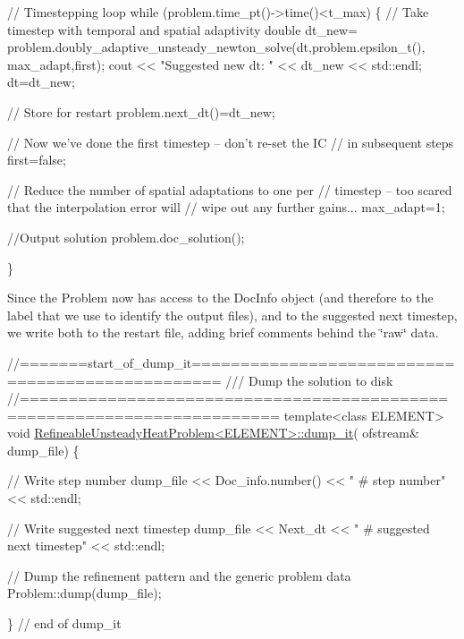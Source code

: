  
\begin{DoxyCodeInclude}
 \textcolor{comment}{// Timestepping loop}
 \textcolor{keywordflow}{while} (problem.time\_pt()->time()<t\_max)
  \{
   \textcolor{comment}{// Take timestep with temporal and spatial adaptivity}
   \textcolor{keywordtype}{double} dt\_new=
   problem.doubly\_adaptive\_unsteady\_newton\_solve(dt,problem.epsilon\_t(),
                                                 max\_adapt,first);
   cout << \textcolor{stringliteral}{"Suggested new dt: "} << dt\_new << std::endl;
   dt=dt\_new;
   
   \textcolor{comment}{// Store for restart}
   problem.next\_dt()=dt\_new;

   \textcolor{comment}{// Now we've done the first timestep -- don't re-set the IC}
   \textcolor{comment}{// in subsequent steps}
   first=\textcolor{keyword}{false};
   
   \textcolor{comment}{// Reduce the number of spatial adaptations to one per }
   \textcolor{comment}{// timestep -- too scared that the interpolation error will }
   \textcolor{comment}{// wipe out any further gains...}
   max\_adapt=1;
   
   \textcolor{comment}{//Output solution}
   problem.doc\_solution();

  \}

\end{DoxyCodeInclude}


Since the {\ttfamily Problem} now has access to the {\ttfamily Doc\+Info} object (and therefore to the label that we use to identify the output files), and to the suggested next timestep, we write both to the restart file, adding brief comments behind the \char`\"{}raw\char`\"{} data.

 
\begin{DoxyCodeInclude}
\textcolor{comment}{//=======start\_of\_dump\_it=================================================}
\textcolor{comment}{/// Dump the solution to disk}
\textcolor{comment}{}\textcolor{comment}{//========================================================================}
\textcolor{keyword}{template}<\textcolor{keyword}{class} ELEMENT>
\textcolor{keywordtype}{void} \hyperlink{classRefineableUnsteadyHeatProblem_a1fb939c3f9c258fd49328bb1516ced98}{RefineableUnsteadyHeatProblem<ELEMENT>::dump\_it}(
      ofstream& dump\_file)
\{

 \textcolor{comment}{// Write step number}
 dump\_file << Doc\_info.number() << \textcolor{stringliteral}{" # step number"} << std::endl;

 \textcolor{comment}{// Write suggested next timestep}
 dump\_file << Next\_dt << \textcolor{stringliteral}{" # suggested next timestep"} << std::endl;

 \textcolor{comment}{// Dump the refinement pattern and the generic problem data}
 Problem::dump(dump\_file);
  
\} \textcolor{comment}{// end of dump\_it}

\end{DoxyCodeInclude}



